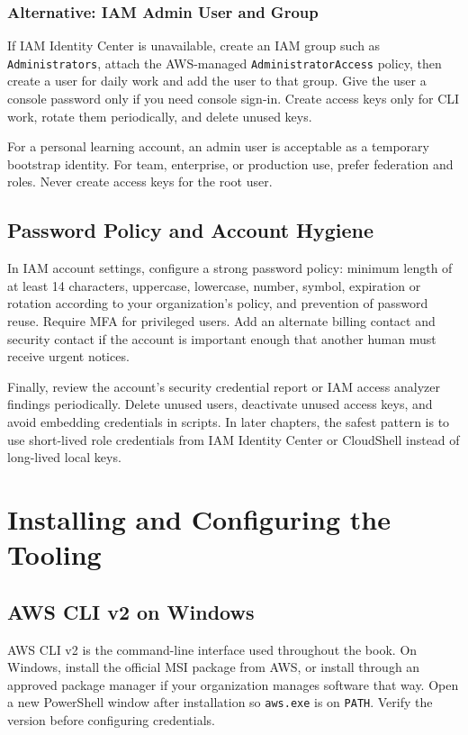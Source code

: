 \subsubsection{Alternative: IAM Admin User and Group}
If IAM Identity Center is unavailable, create an IAM group such as \texttt{Administrators}, attach the AWS-managed \texttt{AdministratorAccess} policy, then create a user for daily work and add the user to that group. Give the user a console password only if you need console sign-in. Create access keys only for CLI work, rotate them periodically, and delete unused keys.

For a personal learning account, an admin user is acceptable as a temporary bootstrap identity. For team, enterprise, or production use, prefer federation and roles. Never create access keys for the root user.

\subsection{Password Policy and Account Hygiene}
In IAM account settings, configure a strong password policy: minimum length of at least 14 characters, uppercase, lowercase, number, symbol, expiration or rotation according to your organization's policy, and prevention of password reuse. Require MFA for privileged users. Add an alternate billing contact and security contact if the account is important enough that another human must receive urgent notices.

Finally, review the account's security credential report or IAM access analyzer findings periodically. Delete unused users, deactivate unused access keys, and avoid embedding credentials in scripts. In later chapters, the safest pattern is to use short-lived role credentials from IAM Identity Center or CloudShell instead of long-lived local keys.

\section{Installing and Configuring the Tooling}
\subsection{AWS CLI v2 on Windows}
AWS CLI v2 is the command-line interface used throughout the book. On Windows, install the official MSI package from AWS, or install through an approved package manager if your organization manages software that way. Open a new PowerShell window after installation so \texttt{aws.exe} is on \texttt{PATH}. Verify the version before configuring credentials.

